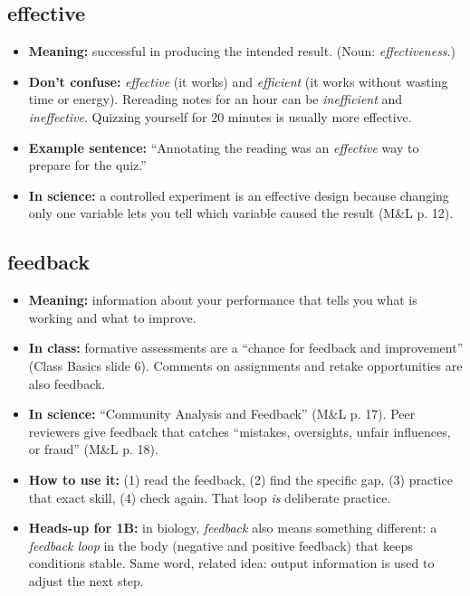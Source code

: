 \documentclass[11pt,letterpaper]{article}
\begin{document}
\subsection{effective}
\begin{itemize}
  \item \textbf{Meaning:} successful in producing the intended result. (Noun: \emph{effectiveness}.)
  \item \textbf{Don't confuse:} \emph{effective} (it works) and \emph{efficient} (it works without wasting time or energy). Rereading notes for an hour can be \emph{inefficient} and \emph{ineffective}. Quizzing yourself for 20 minutes is usually more effective.
  \item \textbf{Example sentence:} ``Annotating the reading was an \emph{effective} way to prepare for the quiz.''
  \item \textbf{In science:} a controlled experiment is an effective design because changing only one variable lets you tell which variable caused the result (M\&L p. 12).
\end{itemize}

\subsection{feedback}
\begin{itemize}
  \item \textbf{Meaning:} information about your performance that tells you what is working and what to improve.
  \item \textbf{In class:} formative assessments are a ``chance for feedback and improvement'' (Class Basics slide 6). Comments on assignments and retake opportunities are also feedback.
  \item \textbf{In science:} ``Community Analysis and Feedback'' (M\&L p. 17). Peer reviewers give feedback that catches ``mistakes, oversights, unfair influences, or fraud'' (M\&L p. 18).
  \item \textbf{How to use it:} (1) read the feedback, (2) find the specific gap, (3) practice that exact skill, (4) check again. That loop \emph{is} deliberate practice.
  \item \textbf{Heads-up for 1B:} in biology, \emph{feedback} also means something different: a \emph{feedback loop} in the body (negative and positive feedback) that keeps conditions stable. Same word, related idea: output information is used to adjust the next step.
\end{itemize}
\end{document}

